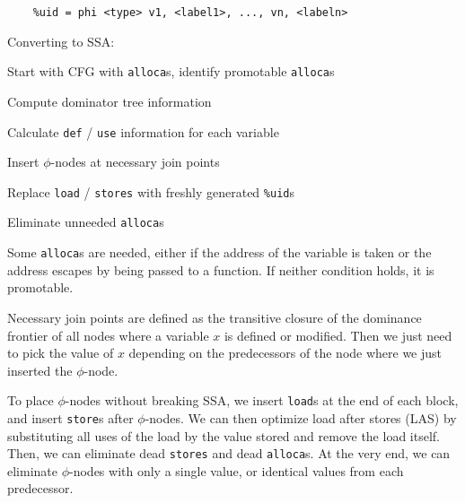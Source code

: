 \begin{lstlisting}
	%uid = phi <type> v1, <label1>, ..., vn, <labeln>
\end{lstlisting}\medskip

Converting to SSA:
\begin{compactitem}
	\item Start with CFG with \texttt{alloca}s, identify promotable \texttt{alloca}s
	\item Compute dominator tree information
	\item Calculate \texttt{def} / \texttt{use} information for each variable
	\item Insert $\phi$-nodes at necessary join points
	\item Replace \texttt{load} / \texttt{stores} with freshly generated \texttt{\%uid}s
	\item Eliminate unneeded \texttt{alloca}s
\end{compactitem}\medskip

Some \texttt{alloca}s are needed, either if the address of the variable is taken or the address escapes by being passed to a function. If neither condition holds, it is promotable.\medskip

Necessary join points are defined as the transitive closure of the dominance frontier of all nodes where a variable $x$ is defined or modified. Then we just need to pick the value of $x$ depending on the predecessors of the node where we just inserted the $\phi$-node.\medskip

To place $\phi$-nodes without breaking SSA, we insert \texttt{load}s at the end of each block, and insert \texttt{store}s after $\phi$-nodes. We can then optimize load after stores (LAS) by substituting all uses of the load by the value stored and remove the load itself. Then, we can eliminate dead \texttt{stores} and dead \texttt{alloca}s. At the very end, we can eliminate $\phi$-nodes with only a single value, or identical values from each predecessor.
